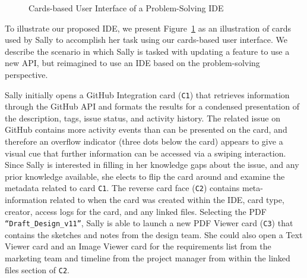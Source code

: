 \documentclass{ppig}
\begin{document}
\begin{figure}[h!]
	\caption{Cards-based User Interface of a Problem-Solving IDE}
	\label{mockup}
	\vspace*{-1.5\baselineskip}
\end{figure}

To illustrate our proposed IDE, we present Figure~\ref{mockup} as an illustration of cards used by Sally to accomplish her task using our cards-based user interface.
We describe the scenario in which Sally is tasked with updating a feature to use a new API, but reimagined to use an IDE based on the problem-solving perspective.

Sally initially opens a GitHub Integration card (\texttt{C1}) that retrieves information through the GitHub API and formats the results for a condensed presentation of the description, tags, issue status, and activity history.
The related issue on GitHub contains more activity events than can be presented on the card, and therefore an overflow indicator (three dots below the card) appears to give a visual cue that further information can be accessed via a swiping interaction.
Since Sally is interested in filling in her knowledge gaps about the issue, and any prior knowledge available, she elects to flip the card around and examine the metadata related to card \texttt{C1}.
The reverse card face (\texttt{C2}) contains meta-information related to when the card was created within the IDE, card type, creator, access logs for the card, and any linked files.
Selecting the PDF \texttt{``Draft\_Design\_v11''}, Sally is able to launch a new PDF Viewer card (\texttt{C3}) that contains the sketches and notes from the design team.
She could also open a Text Viewer card and an Image Viewer card for the requirements list from the marketing team and timeline from the project manager from within the linked files section of \texttt{C2}.
\end{document}
